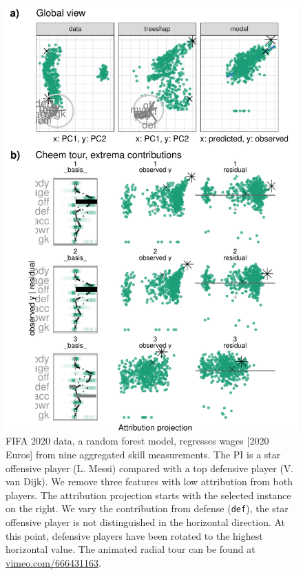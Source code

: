 \documentclass[
]{article}
\begin{document}
\begin{figure}

{\centering \includegraphics[width=1\linewidth]{./figures/case_fifa} 

}

\caption{FIFA 2020 data, a random forest model, regresses wages {[}2020 Euros{]} from nine aggregated skill measurements. The PI is a star offensive player (L. Messi) compared with a top defensive player (V. van Dijk). We remove three features with low attribution from both players. The attribution projection starts with the selected instance on the right. We vary the contribution from defense (\texttt{def}), the star offensive player is not distinguished in the horizontal direction. At this point, defensive players have been rotated to the highest horizontal value. The animated radial tour can be found at \href{https://vimeo.com/666431163}{vimeo.com/666431163}.}\label{fig:casefifa}
\end{figure}
\end{document}
